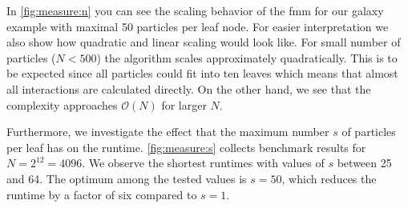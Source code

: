 In \cref{fig:measure:n} you can see the scaling behavior of the \gls{fmm} for our galaxy example with maximal 50 particles per leaf node.
For easier interpretation we also show how quadratic and linear scaling would look like.
For small number of particles ($N < 500$) the algorithm scales approximately quadratically.
This is to be expected since all particles could fit into ten leaves which means that almost all interactions are calculated directly.
On the other hand, we see that the complexity approaches $\mathcal{O}(N)$ for larger $N$.

Furthermore, we investigate the effect that the maximum number $s$ of particles per leaf has on the runtime.
\cref{fig:measure:s} collects benchmark results for $N = 2^{12} = 4096$.
We observe the shortest runtimes with values of $s$ between 25 and 64.
The optimum among the tested values is $s=50$, which reduces the runtime by a factor of six compared to $s=1$.
